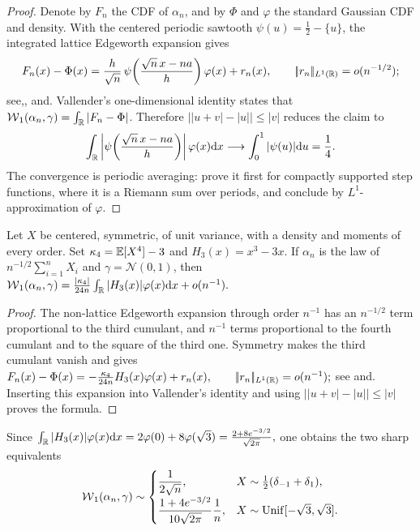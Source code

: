 \begin{proof}
Denote by \(F_n\) the CDF of \(\alpha_n\), and by \(\Phi\) and \(\varphi\) the standard Gaussian CDF and density. With the centered periodic sawtooth \(\psi(u)=\frac12-\{u\}\), the integrated lattice Edgeworth expansion gives
\[
F_n(x)-\Phi(x)
=
\frac h{\sqrt n}\,
\psi\!\left(\frac{\sqrt n\,x-na}{h}\right)\varphi(x)+r_n(x),
\qquad
|\!| r_n |\!|_{L^1(\mathbb{R})}=o(n^{-1/2});
\]
see,, and. Vallender's one-dimensional identity states that \(\operatorname{\mathcal{W}}_1(\alpha_n,\gamma)=\int_{\mathbb{R}}|F_n-\Phi|\). Therefore \(\big||u+v|-|u|\big|\leq|v|\) reduces the claim to
\[
\int_{\mathbb{R}}
\left|\psi\!\left(\frac{\sqrt n\,x-na}{h}\right)\right|
\varphi(x)\mathrm{d} x
\longrightarrow
\int_0^1|\psi(u)|\mathrm{d} u
=
\frac14.
\]
The convergence is periodic averaging: prove it first for compactly supported step functions, where it is a Riemann sum over periods, and conclude by \(L^1\)-approximation of \(\varphi\).
\end{proof}
\begin{prop}\label{prop-sharp-density-w1-clt}
Let \(X\) be centered, symmetric, of unit variance, with a density and moments of every order. Set \(\kappa_4=\mathbb{E}[X^4]-3\) and \(H_3(x)=x^3-3x\). If \(\alpha_n\) is the law of \(n^{-1/2}\sum_{i=1}^nX_i\) and \(\gamma=\mathcal N(0,1)\), then
\(\operatorname{\mathcal{W}}_1(\alpha_n,\gamma) = \frac{|\kappa_4|}{24n} \int_{\mathbb{R}} |H_3(x)|\varphi(x)\mathrm{d} x +o(n^{-1}).\)
\end{prop}
\begin{proof}
The non-lattice Edgeworth expansion through order \(n^{-1}\) has an \(n^{-1/2}\) term proportional to the third cumulant, and \(n^{-1}\) terms proportional to the fourth cumulant and to the square of the third one. Symmetry makes the third cumulant vanish and gives
\(F_n(x)-\Phi(x) =-\frac{\kappa_4}{24n}H_3(x)\varphi(x)+r_n(x), \qquad |\!| r_n |\!|_{L^1(\mathbb{R})}=o(n^{-1});\)
see and. Inserting this expansion into Vallender's identity and using \(\big||u+v|-|u|\big|\leq|v|\) proves the formula.
\end{proof}
Since
\(\int_{\mathbb{R}} |H_3(x)|\varphi(x)\mathrm{d} x =2\varphi(0)+8\varphi(\sqrt3) =\frac{2+8e^{-3/2}}{\sqrt{2\pi}},\)
one obtains the two sharp equivalents
\begin{equation}\label{eq-bernoulli-uniform-sharp-w1-clt}
\operatorname{\mathcal{W}}_1(\alpha_n,\gamma)
\sim
\begin{cases}
\dfrac1{2\sqrt n},
& X\sim\frac12(\delta_{-1}+\delta_1),\\[2mm]
\dfrac{1+4e^{-3/2}}{10\sqrt{2\pi}}\dfrac1n,
& X\sim\operatorname{Unif}[-\sqrt3,\sqrt3].
\end{cases}
\end{equation}
